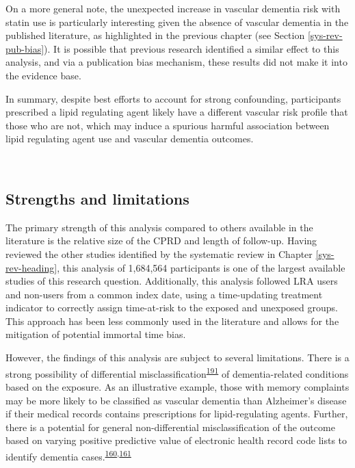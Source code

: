 \documentclass[a4paper, twoside]{templates/ociamthesis}
\begin{document}
On a more general note, the unexpected increase in vascular dementia risk with statin use is particularly interesting given the absence of vascular dementia in the published literature, as highlighted in the previous chapter (see Section \ref{sys-rev-pub-bias}). It is possible that previous research identified a similar effect to this analysis, and via a publication bias mechanism, these results did not make it into the evidence base.

In summary, despite best efforts to account for strong confounding, participants prescribed a lipid regulating agent likely have a different vascular risk profile that those who are not, which may induce a spurious harmful association between lipid regulating agent use and vascular dementia outcomes.

~

\hypertarget{strengths-and-limitations-1}{%
\subsection{Strengths and limitations}\label{strengths-and-limitations-1}}

The primary strength of this analysis compared to others available in the literature is the relative size of the CPRD and length of follow-up. Having reviewed the other studies identified by the systematic review in Chapter \ref{sys-rev-heading}, this analysis of 1,684,564 participants is one of the largest available studies of this research question. Additionally, this analysis followed LRA users and non-users from a common index date, using a time-updating treatment indicator to correctly assign time-at-risk to the exposed and unexposed groups. This approach has been less commonly used in the literature and allows for the mitigation of potential immortal time bias.

However, the findings of this analysis are subject to several limitations. There is a strong possibility of differential misclassification\textsuperscript{\protect\hyperlink{ref-porta2014dictionary}{191}} of dementia-related conditions based on the exposure. As an illustrative example, those with memory complaints may be more likely to be classified as vascular dementia than Alzheimer's disease if their medical records contains prescriptions for lipid-regulating agents. Further, there is a potential for general non-differential misclassification of the outcome based on varying positive predictive value of electronic health record code lists to identify dementia cases.\textsuperscript{\protect\hyperlink{ref-mcguinness2019validity}{160},\protect\hyperlink{ref-wilkinson2018}{161}}
\end{document}
